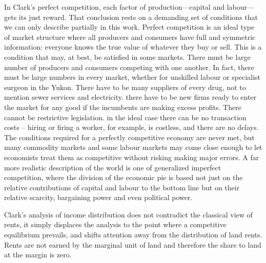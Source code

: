  In Clark's  perfect competition, %
 each factor of production—capital and labour—gets its just reward. That conclusion rests on a demanding set of conditions that we can only describe partially in this work. Perfect competition is an ideal type of market structure where all producers and consumers have full and symmetric information: everyone knows the true value of whatever they buy or sell.  This is a condition that may, at best, be satisfied in some markets. There must be large number of producers and consumers competing with one another. In fact, there must be large numbers in every market, whether for unskilled labour or specialist surgeon in the Yukon.  There have to be many suppliers of every drug, not to mention sewer services and electricity. there have to be new firms ready to enter the market  for any good  if the incumbents are making excess profits. There cannot be restrictive legislation. in the ideal case there can be no transaction costs -- hiring or firing a worker, for example,  is costless,  and there are no delays. The conditions required for a perfectly competitive economy are never met, but many commodity markets and some labour markets may come close enough to let economists treat them as competitive without risking making major errors. 
 A far more realistic description of the world is one of generalized  \gls{imperfect competition}, where the division of the economic pie is based not just on the relative contributions of capital and labour to the bottom line but on their relative scarcity, bargaining power and even political power.  %
 
Clark's analysis of income distribution does not contradict the classical view of rents, it simply displaces the analysis to the point where a competitive equilibrium prevails, and shifts attention away from the distribution of land rents. Rents are not earned by the marginal unit of land and therefore the share to land at the margin is zero. 



